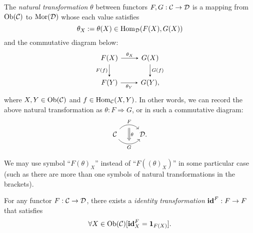 \documentclass{article}
\begin{document}
\begin{defi}\label{natural transformation}
	The \emph{natural transformation} $\theta$ between functors $F,G:\mathcal{C}\to\mathcal{D}$ is a mapping from $\mathrm{Ob}(\mathcal{C})$ to $\mathrm{Mor}(\mathcal{D})$ whose each value satisfies
	\[\theta_X:=\theta(X)\in\mathrm{Hom}_{\mathcal{D}}(F(X),G(X))\]
	and the commutative diagram below:
	\begin{equation}\begin{tikzcd}\label{ntr}
		F(X) \arrow[->,>=stealth,r,"\theta_X"] \arrow[->,>=stealth,d,"F(f)"'] & G(X) \arrow[->,>=stealth,d,"G(f)"]\\
		F(Y) \arrow[->,>=stealth,r,"\theta_Y"'] & G(Y),
	\end{tikzcd}\end{equation}
	where $X,Y\in\mathrm{Ob}(\mathcal{C})$ and $f\in\mathrm{Hom}_{\mathcal{C}}(X,Y)$. In other words, we can record the above natural transformation as $\theta:F\Rightarrow G$, or in such a commutative diagram:
	\[\begin{tikzcd}
			\C \arrow[r, "F", bend left=50, ""' name=F] \arrow[r, "G"', bend right=50, "" name=G] & \arrow[Rightarrow, from=F, to=G, "\theta"] \D.
	\end{tikzcd}\]
	
	We may use symbol ``$F(\theta)_X$'' instead of ``$F((\theta)_X)$'' in some particular case (such as there are more than one symbols of natural transformations in the brackets).
	
	For any functor $F:\mathcal{C}\to\mathcal{D}$, there exists a \emph{identity transformation} $\mathbf{id}^F:F\to F$ that satisfies
	 \[\forall X\in\mathrm{Ob}(\mathcal{C})[\mathbf{id}^F_X=\mathbf{1}_{F(X)}].\]
\end{defi}
\end{document}
